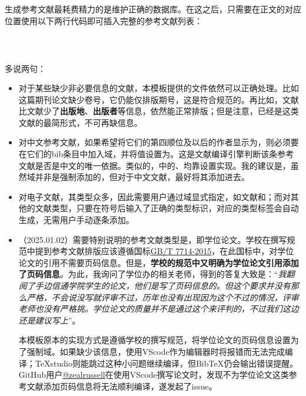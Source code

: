 \documentclass[print, doctor, vlined]{DissertUESTC}
\begin{document}
	生成参考文献最耗费精力的是维护正确的数据库。在这之后，只需要在正文的对应位置使用以下两行代码即可插入完整的参考文献列表：
	\begin{verbatim}
		
		
	\end{verbatim}
	
	多说两句：
	\begin{itemize}
		\item 对于某些缺少非必要信息的文献，本模板提供的文件依然可以正确处理。比如\cite{王晓琰2019关于连续出版会议论文著录格式的探讨}这篇期刊论文缺少卷号，它仍能仅排版期号，这是符合规范的。再比如，文献\cite{电子文献2}比文献\cite{电子文献1}少了\textbf{出版地}、\textbf{出版者}等信息，依然能正常排版；但是注意，\cite{电子文献2}已经是这类文献的最简形式，不可再缺信息。
		
		\item 对中文参考文献，如果希望将它们的第四顺位及以后的作者显示为，则必须要在它们的bib条目中加入域，并将值设置为。这是文献编译引擎判断该条参考文献是否是中文的唯一依据。类似的，\cite{罗杰斯2011}中的、均靠设置实现。我的建议是，虽然域并非是强制添加的，但对于中文文献，最好将其添加进去。
		
		\item 对电子文献，其类型众多，因此需要用户通过域显式指定，如文献\cite{电子文献1}和\cite{电子文献2}；而对其他的文献类型，只要在符号后输入了正确的类型标识，对应的类型标签会自动生成，无需用户手动逐条添加。
		
		\item （2025.01.02）需要特别说明的参考文献类型是，即学位论文。学校在撰写规范中提到参考文献排版应该遵循国标\href{https://lib.tsinghua.edu.cn/wj/GBT7714-2015.pdf}{\color{notsored}GB/T 7714-2015}，在此国标中，对学位论文的引用不需要页码信息。但是，\textbf{学校的规范中又明确为学位论文引用添加了页码信息}。为此，我询问了学位办的相关老师，得到的答复大致是：“\textit{我翻阅了手边信通学院学生的论文，他们是写了页码信息的。但这个要求并没有那么严格，不会说没写就评审不过，历年也没有出现因为这个不过的情况，评审老师也没有严格挑。学位论文的质量并不是通过这个来评判的，不过我们这边还是建议写上}”。
   
		本模板原本的实现方式是遵循学校的撰写规范，将学位论文的页码信息设置为了强制域。如果缺少该信息，使用VScode作为编辑器时将报错而无法完成编译；TeXstudio则能跳过这种小问题继续编译，但BibTeX仍会输出错误提醒。GitHub用户\href{https://github.com/zealrussell}{\color{notsored}@zealrussell}在使用VScode撰写论文时，发现不为学位论文这类参考文献添加页码信息将无法顺利编译，遂发起了issue。
		

\end{itemize}
\end{document}
